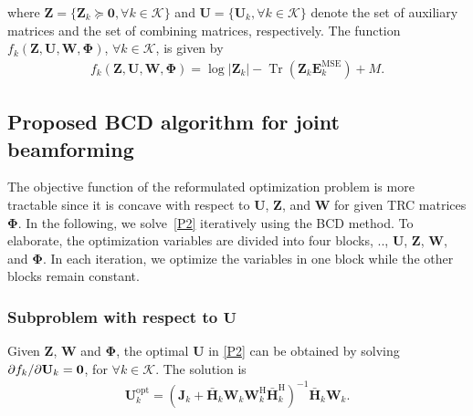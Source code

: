 \documentclass[12pt, draftclsnofoot, onecolumn]{IEEEtran}
\DeclareMathOperator{\tr}{Tr}
\newcommand{\ie}{\text{i}.\text{e}.}
\begin{document}
where $\mathbf{Z}=\{\mathbf{Z}_k\succeq \mathbf{0}, \forall k \in \mathcal{K}\}$ and $\mathbf{U}=\{\mathbf{U}_k, \forall k \in \mathcal{K}\}$ denote the set of auxiliary matrices and the set of combining matrices, respectively. The function $f_k\left(\mathbf{Z},\mathbf{U},\mathbf{W},\mathbf{\Phi}\right)$, $\forall k \in \mathcal{K}$, is given by
\begin{equation}\label{f}
\begin{aligned}
f_k\left(\mathbf{Z},\mathbf{U},\mathbf{W},\mathbf{\Phi}\right)=\log\left|\mathbf{Z}_k\right|-\tr\left(\mathbf{Z}_k\mathbf{E}_k^{\text{MSE}}\right)+M.
\end{aligned}
\end{equation}
\subsection{Proposed BCD algorithm for joint beamforming }
{The objective function of the reformulated optimization problem is more tractable since it is concave with respect to $\mathbf{U}$, $\mathbf{Z}$, and $\mathbf{W}$ for given TRC matrices $\mathbf{\Phi}$.} In the following, we solve~\eqref{P2} iteratively using the BCD method. To elaborate, the optimization variables are divided into four blocks, \ie, $\mathbf{U}$, $\mathbf{Z}$, $\mathbf{W}$, and $\mathbf{\Phi}$. In each iteration, we optimize the variables in one block while the other blocks remain constant.
\subsubsection{Subproblem with respect to $\mathbf{U}$}
Given $\mathbf{Z}$, $\mathbf{W}$ and $\mathbf{\Phi}$, the optimal $\mathbf{U}$ in \eqref{P2} can be obtained by solving ${{\partial {f_{k}}} \mathord{\left/
{\vphantom {{\partial {f_{k}}} {\partial {\mathbf{U}_k}}}} \right.\kern-\nulldelimiterspace} {\partial {\mathbf{U}_k}}}=\mathbf{0}$, for $\forall k \in \mathcal{K}$. The solution is
\begin{equation}\label{U}
\begin{aligned}
\mathbf{U}_k^{\text{opt}}=\left(\mathbf{J}_k+\bar{\mathbf{H}}_k\mathbf{W}_{{k}}\mathbf{W}_{{k}}^\mathrm{H}\bar{\mathbf{H}}_k^\mathrm{H}\right)^{-1}\bar{\mathbf{H}}_k\mathbf{W}_k.
\end{aligned}
\end{equation}
\end{document}

